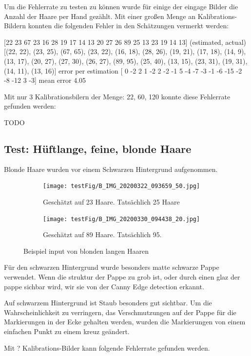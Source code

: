 \documentclass[german,a4paper, 12pt]{scrartcl}
\begin{document}
Um die Fehlerrate zu testen zu können wurde für einige der eingage Bilder die Anzahl der Haare per Hand gezählt.
Mit einer großen Menge an Kalibrations-Bildern konnten die folgenden Fehler in den Schätzungen vermerkt werden:
 
[22 23 67 23 16 28 19 17 14 13 20 27 26 89 25 13 23 19 14 13]
(estimated, actual)
[(22, 22), (23, 25), (67, 65), (23, 22), (16, 18), (28, 26), (19, 21), (17, 18), (14, 9), (13, 17), (20, 27), (27, 30), (26, 27), (89, 95), (25, 40), (13, 15), (23, 31), (19, 31), (14, 11), (13, 16)]
error per estimation [  0  -2   2   1  -2   2  -2  -1   5  -4  -7  -3  -1  -6 -15  -2  -8 -12 3  -3]
mean error 4.05

Mit nur 3 Kalibrationsbilern der Menge: 22, 60, 120 konnte diese Fehlerrate gefunden werden:

TODO

\subsection{Test: Hüftlange, feine, blonde Haare}

Blonde Haare wurden vor einem Schwarzen Hintergrund aufgenommen. 

\begin{figure}
	\centering
	\begin{subfigure}[b]{0.475\textwidth}
		\centering
		\texttt{[image: testFig/B\_IMG\_20200322\_093659\_50.jpg]}
		\caption[]{Geschätzt auf 23 Haare. Tatsächlich 25 Haare}
		\label{img:tstM1} 
	\end{subfigure}
	\hfill
	\begin{subfigure}[b]{0.475\textwidth} 
		\centering
		\texttt{[image: testFig/B\_IMG\_20200330\_094438\_20.jpg]}
		\caption[]{Geschätzt auf 89 Haare. Tatsächlich 95.}
		\label{img:tstM2}
	\end{subfigure}
	\caption[  ]
	{\small Beispiel input von blonden langen Haaren} 
	\label{img:tstM}
\end{figure}
Für den schwarzen Hintergrund wurde besonders matte schwarze Pappe verwendet. Wenn die struktur der Pappe zu grob ist, oder durch einen glaz der pappe sichbar wird, wir sie von der Canny Edge detection erkannt. 

Auf schwarzem Hintergrund ist Staub besonders gut sichtbar. Um die Wahrscheinlichkeit zu verringern, das Verschmutzungen auf der Pappe für die Markierungen in der Ecke gehalten werden, wurden die Markierungen von einem einfachen Punkt zu einem kreuz geändert.  

Mit ? Kalibrations-Bilder kann folgende Fehlerrate gefunden werden.
\end{document}
